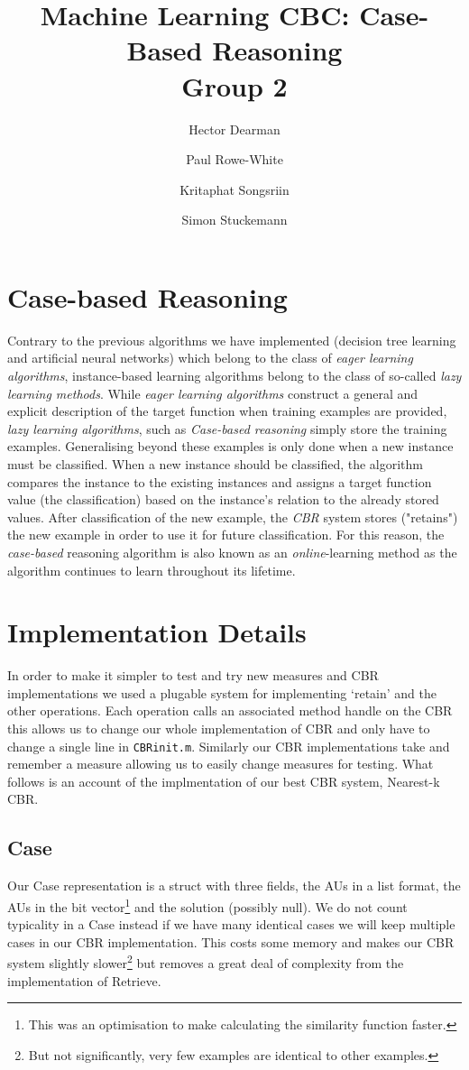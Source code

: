 \documentclass[10pt,a4paper]{article}
\author{Hector Dearman \and Paul Rowe-White \and Kritaphat Songsriin \and Simon Stuckemann}
\title{Machine Learning CBC: Case-Based Reasoning\\Group 2}
\begin{document}
\maketitle

\section{Case-based Reasoning}
Contrary to the previous algorithms we have implemented (decision tree learning and artificial neural networks) which belong to the class of \emph{eager learning algorithms}, instance-based learning algorithms belong to the class  of so-called \emph{lazy learning methods}.
While \emph{eager learning algorithms} construct a general and explicit description of the target function when training examples are provided, \emph{lazy learning algorithms}, such as \emph{Case-based reasoning} simply store the training examples. Generalising beyond these examples is only done when a new instance must be classified. When a new instance should be classified, the algorithm compares the instance to the existing instances and assigns a target function value (the classification) based on the instance's relation to the already stored values. After classification of the new example, the \emph{CBR} system stores ("retains") the new example in order to use it for future classification. For this reason, the \emph{case-based} reasoning algorithm is also known as an \emph{online}-learning method as the algorithm continues to learn throughout its lifetime.

\section{Implementation Details}
In order to make it simpler to test and try new measures and CBR implementations
we used a plugable system for implementing `retain' and the other operations.
Each operation calls an associated method handle on the CBR this allows us to change our whole implementation of CBR
and only have to change a single line in {\tt CBRinit.m}.
Similarly our CBR implementations take and remember a measure allowing us to easily change measures for testing.
What follows is an account of the implmentation of our best CBR system, Nearest-k CBR.

\subsection{Case}
Our Case representation is a struct with three fields, the AUs in a list format,
the AUs in the bit vector\footnote{This was an optimisation to make calculating the similarity function faster.} and the solution (possibly null).
We do not count typicality in a Case instead if we have many identical cases we will keep multiple cases in our CBR implementation.
This costs some memory and makes our CBR system slightly slower\footnote{But not significantly, very few examples are identical to other examples.} but removes a great deal of complexity from the implementation of Retrieve.
\end{document}
